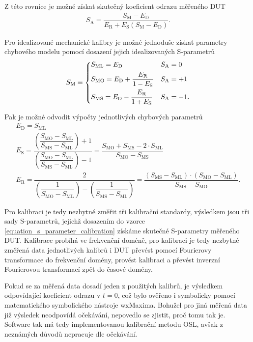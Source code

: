 Z této rovnice je možné získat skutečný koeficient odrazu měřeného DUT
\begin{equation}
\begin{gathered}
	S_\mathrm{A} = \dfrac{S_\mathrm{M} - E_\textrm{D}}{E_\textrm{R} + E_\textrm{S} \left( S_\mathrm{M} - E_\textrm{D} \right) }.
\end{gathered}
\label{equation_s_parameter_calibration}
\end{equation}

Pro idealizované mechanické kalibry je možné jednoduše získat parametry chybového modelu pomocí dosazení jejich idealizovaných S-parametrů
\begin{equation}
\begin{gathered}
S_\mathrm{M}=
   \begin{dcases}
	S_\mathrm{ML} = E_\textrm{D} & S_\mathrm{A}=0	\\
	S_\mathrm{MO} = E_\textrm{D} + \dfrac{E_\textrm{R}}{1-E_\mathrm{S}}  & S_\mathrm{A}=+1	\\
	S_\mathrm{MS} = E_\textrm{D} - \dfrac{E_\textrm{R}}{1+E_\mathrm{S}}  & S_\mathrm{A}=-1.
   \end{dcases}
\end{gathered}
\end{equation}

Pak je možné odvodit výpočty jednotlivých chybových parametrů
\begin{equation}
\begin{gathered}
   E_\textrm{D}=S_\mathrm{ML} \\
   E_\mathrm{S}=\dfrac{\left( \dfrac{S_\mathrm{MO}-S_\mathrm{ML}}{S_\mathrm{MS}-S_\mathrm{ML}}\right)  +1}{\left( \dfrac{S_\mathrm{MO}-S_\mathrm{ML}}{S_\mathrm{MS}-S_\mathrm{ML}}\right) -1} = \dfrac{S_\mathrm{MO} + S_\mathrm{MS} -2\cdot S_\mathrm{ML}}{S_\mathrm{MO} - S_\mathrm{MS}} \\
   E_\mathrm{R}=\dfrac{2}{\left( \dfrac{1}{S_\mathrm{MO}-S_\mathrm{ML}}\right)  - \left( \dfrac{1}{S_\mathrm{MS}-S_\mathrm{ML}} \right) } = \dfrac{\left( S_\mathrm{MS} - S_\mathrm{ML} \right) \cdot \left( S_\mathrm{MO} - S_\mathrm{ML} \right) }{S_\mathrm{MS} - S_\mathrm{MO}}.
\end{gathered}
\end{equation}

Pro kalibraci je tedy nezbytné změřit tři kalibrační standardy, výsledkem jsou tři sady S-parametrů, jejichž dosazením do vzorce \ref{equation_s_parameter_calibration} získáme skutečné S-parametry měřeného DUT. Kalibrace probíhá ve frekvenční doméně, pro kalibraci je tedy nezbytné změřená data jednotlivých kalibrů i DUT převést pomocí Fourierovy transformace do frekvenční domény, provést kalibraci a převést inverzní Fourierovou transformací zpět do časové domény.

Pokud se za měřená data dosadí jeden z použitých kalibrů, je výsledkem odpovídající koeficient odrazu v $t=0$, což bylo ověřeno i symbolicky pomocí matematického symbolického nástroje wxMaxima. Bohužel pro jiná měřená data již výsledek neodpovídá očekávání, nepovedlo se zjistit, proč tomu tak je. Software tak má tedy implementovanou kalibrační metodu OSL, avšak z neznámých důvodů nepracuje dle očekávání.
